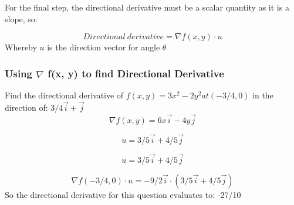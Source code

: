 \documentclass{article}
\begin{document}
For the final step, the directional derivative must be a scalar quantity as it is a slope, so:

\begin{equation}
Directional\ derivative = \nabla f(x,y)\cdot u
\end{equation}
Whereby $u$ is the direction vector for angle $\theta$\\


\subsubsection{Using $\nabla$ f(x, y) to find Directional Derivative}
Find the directional derivative of $f(x,y) = 3x^2 - 2y^2 at (-3/4, 0)$ in the direction of:
$3/4\vec{i}+\vec{j}$\\

\begin{equation}
\nabla f(x,y) = 6x\vec{i}-4y\vec{j}
\end{equation}

\begin{equation}
u = 3/5\vec{i}+4/5\vec{j}
\end{equation}

\begin{equation}
u = 3/5\vec{i}+4/5\vec{j}
\end{equation}

\begin{equation}
\nabla f(-3/4, 0)\cdot u = -9/2\vec{i}\cdot(3/5\vec{i}+4/5\vec{j})
\end{equation}
So the directional derivative for this question evaluates to: -27/10\\
\end{document}

